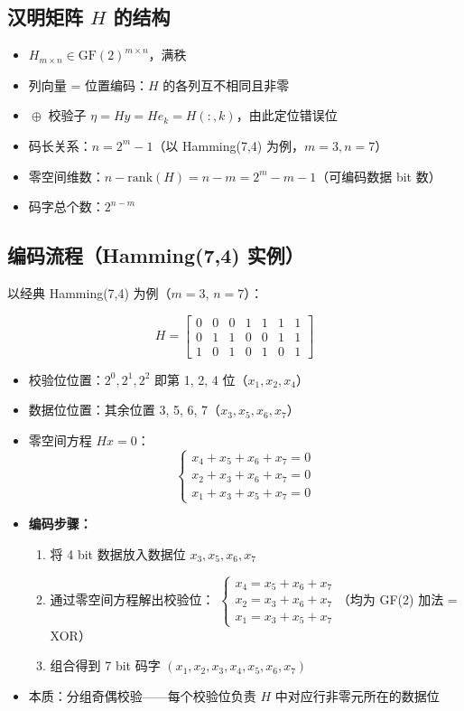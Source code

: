 \documentclass[12pt,a4paper]{ctexart}
\theoremstyle{definition}
\begin{document}
\subsection{汉明矩阵 $H$ 的结构}

\begin{itemize}[nosep]
  \item $H_{m \times n} \in \mathrm{GF}(2)^{m \times n}$，满秩
  \item 列向量 = 位置编码：$H$ 的各列互不相同且非零
  \item ${}\oplus{}$ 校验子 $\eta = Hy = He_k = H(:,k)$，由此定位错误位
  \item 码长关系：$n = 2^m - 1$（以 Hamming(7,4) 为例，$m=3, n=7$）
  \item 零空间维数：$n - \mathrm{rank}(H) = n - m = 2^m - m - 1$（可编码数据 bit 数）
  \item 码字总个数：$2^{n-m}$
\end{itemize}

\subsection{编码流程（Hamming(7,4) 实例）}

以经典 Hamming(7,4) 为例（$m=3$, $n=7$）：

\[
H = \begin{bmatrix}
0 & 0 & 0 & 1 & 1 & 1 & 1 \\
0 & 1 & 1 & 0 & 0 & 1 & 1 \\
1 & 0 & 1 & 0 & 1 & 0 & 1
\end{bmatrix}
\]

\begin{itemize}[nosep]
  \item 校验位位置：$2^0, 2^1, 2^2$ 即第 1, 2, 4 位（$x_1, x_2, x_4$）
  \item 数据位位置：其余位置 3, 5, 6, 7（$x_3, x_5, x_6, x_7$）
  \item 零空间方程 $Hx = 0$：
  \[
  \begin{cases}
  x_4 + x_5 + x_6 + x_7 = 0 \\
  x_2 + x_3 + x_6 + x_7 = 0 \\
  x_1 + x_3 + x_5 + x_7 = 0
  \end{cases}
  \]
  \item \textbf{编码步骤：}
  \begin{enumerate}[nosep]
    \item 将 4 bit 数据放入数据位 $x_3, x_5, x_6, x_7$
    \item 通过零空间方程解出校验位：
    $\begin{cases}
    x_4 = x_5 + x_6 + x_7 \\
    x_2 = x_3 + x_6 + x_7 \\
    x_1 = x_3 + x_5 + x_7
    \end{cases}$（均为 GF(2) 加法 = XOR）
    \item 组合得到 7 bit 码字 $(x_1, x_2, x_3, x_4, x_5, x_6, x_7)$
  \end{enumerate}
  \item 本质：分组奇偶校验——每个校验位负责 $H$ 中对应行非零元所在的数据位
\end{itemize}
\end{document}
